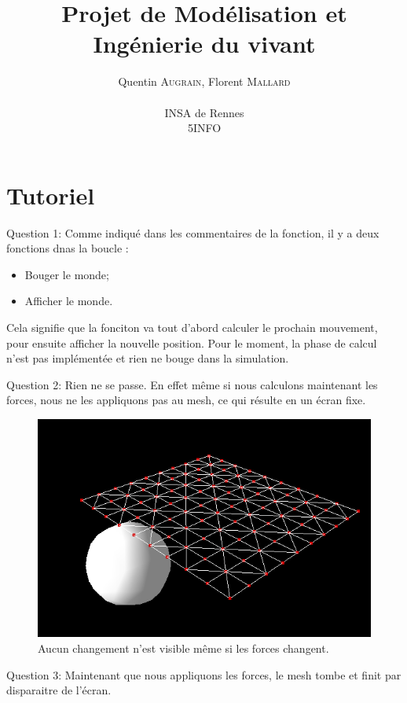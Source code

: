 \documentclass[a4paper,12pt]{article}
\author{
  Quentin \textsc{Augrain}, Florent \textsc{Mallard} \\ \\
  INSA de Rennes \\
  5INFO
}
\title{Projet de Modélisation et Ingénierie du vivant}
\begin{document}
\maketitle

\section{Tutoriel}

Question 1: Comme indiqué dans les commentaires de la fonction, il y a deux fonctions dnas la boucle :
\begin{itemize}
    \item Bouger le monde;
    \item Afficher le monde.
\end{itemize}

Cela signifie que la fonciton va tout d'abord calculer le prochain mouvement, pour ensuite afficher la nouvelle position. Pour le moment, la phase de calcul n'est pas implémentée et rien ne bouge dans la simulation.

Question 2: Rien ne se passe. En effet même si nous calculons maintenant les forces, nous ne les appliquons pas au mesh, ce qui résulte en un écran fixe.
\begin{figure}
  \centering
  \includegraphics{q2.png}
  \caption{Aucun changement n'est visible même si les forces changent.}
  \label{fig:q2}
\end{figure}

Question 3: Maintenant que nous appliquons les forces, le mesh tombe et finit par disparaitre de l'écran.
\end{document}
